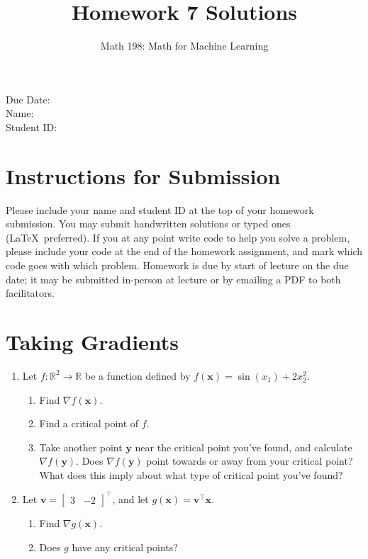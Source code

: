 \documentclass{article}
\title{Homework 7 Solutions}
\author{Math 198: Math for Machine Learning}
\date{}
\begin{document}
\maketitle

\noindent
Due Date:  \\
Name: \\
Student ID:

\section*{Instructions for Submission}
Please include your name and student ID at the top of your homework submission. You may submit handwritten solutions or typed ones (\LaTeX\ preferred). If you at any point write code to help you solve a problem, please include your code at the end of the homework assignment, and mark which code goes with which problem. Homework is due by start of lecture on the due date; it may be submitted in-person at lecture or by emailing a PDF to both facilitators.

\section{Taking Gradients}
\begin{enumerate}[label=\arabic*.]
\item Let $f: \mathbb{R}^2 \rightarrow \mathbb{R}$ be a function defined by $f(\mathbf{x}) = \sin(x_1) + 2x_2^2$.
	\begin{enumerate}[label=(\alph*)]
	\item Find $\nabla f(\mathbf{x})$.
	\item Find a critical point of $f$.
	\item Take another point $\mathbf{y}$ near the critical point you've found, and calculate $\nabla f(\mathbf{y})$. Does $\nabla f(\mathbf{y})$ point towards or away from your critical point? What does this imply about what type of critical point you've found?
	\end{enumerate}
\item Let $\mathbf{v} = \begin{bmatrix} 3 & -2 \end{bmatrix}^\top$, and let $g(\mathbf{x}) = \mathbf{v^\top x}$.
	\begin{enumerate}[label=(\alph*)]
	\item Find $\nabla g(\mathbf{x})$.
	\item Does $g$ have any critical points?
	\end{enumerate}
\end{enumerate}
\end{document}
